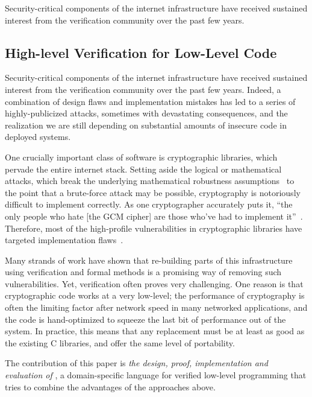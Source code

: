 Security-critical components of the internet infrastructure have
received sustained interest from the verification community over the past few
years.

\subsection{High-level Verification for Low-Level Code}
Security-critical components of the internet infrastructure have
received sustained interest from the verification community over the past few
years. Indeed, a combination of design flaws and implementation mistakes has led
to a series of highly-publicized attacks, sometimes with devastating consequences,
and the realization we are still depending on substantial amounts of insecure code in
deployed systems.

One crucially important class of software is cryptographic
libraries,
which pervade the entire internet stack.
Setting aside the logical or mathematical
attacks, which break the underlying mathematical robustness
assumptions~\cite{freestart} to the point that a brute-force attack may be
possible, cryptography is notoriously difficult to implement correctly. As one
cryptographer accurately puts it, ``the only people who hate [the GCM cipher]
are those who’ve had to implement it''~\cite{green-gcm}. Therefore,
most of the high-profile vulnerabilities in cryptographic
libraries have targeted
implementation flaws~\cite{Heartbleed}.

Many strands of work have shown that re-building parts
of this infrastructure using verification and formal methods is a
promising way of removing such vulnerabilities.
%
Yet, verification often proves very challenging. One reason is that
cryptographic code works at a very low-level; the performance of cryptography is
often the limiting factor after network speed in many networked applications,
and the code is hand-optimized to squeeze the last bit of performance out of the
system. In practice, this means that any replacement must be at least
as good as the existing C libraries, and offer the same level of portability.


The contribution of this paper is \emph{the design, proof, implementation
and evaluation of \lowstar}, a domain-specific language for
verified low-level programming
that tries to combine the advantages of the approaches above.

